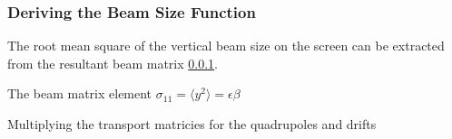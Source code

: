 \subsubsection{Deriving the Beam Size Function}

The root mean square of the vertical beam size on the screen can be extracted
from the resultant beam matrix \ref{}.

The beam matrix element \(\sigma_{11} = \langle y^2 \rangle = \epsilon\beta\)

Multiplying the transport matricies for the quadrupoles and drifts



